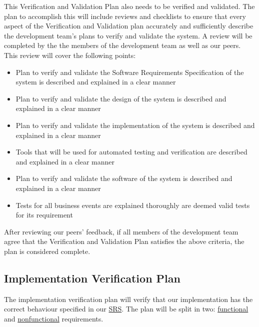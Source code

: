 \documentclass[12pt, titlepage]{article}
\begin{document}
This Verification and Validation Plan also needs to be verified and validated.
The plan to accomplish this will include reviews and checklists to ensure that
every aspect of the Verification and Validation plan accurately and sufficiently
describe the development team's plans to verify and validate the system. A
review will be completed by the the members of the development team as well as
our peers. This review will cover the following points:
\begin{itemize}
    \item Plan to verify and validate the Software Requirements Specification of
    the system is described and explained in a clear manner
    \item Plan to verify and validate the design of the system is described and
    explained in a clear manner
    \item Plan to verify and validate the implementation of the system is
    described and explained in a clear manner
    \item Tools that will be used for automated testing and verification are
    described and explained in a clear manner
    \item Plan to verify and validate the software of the system is described
    and explained in a clear manner
    \item Tests for all business events are explained thoroughly are deemed
    valid tests for its requirement
\end{itemize}

After reviewing our peers' feedback, if all members of the development team
agree that the Verification and Validation Plan satisfies the above criteria,
the plan is considered complete.

\subsection{Implementation Verification Plan}
\label{sec:implementation}


  
The implementation verification plan will verify that our implementation has the
correct behaviour specified in our
\href{https://github.com/parkd-app/park-d/blob/main/docs/SRS/SRS.pdf}{SRS}. The
plan will be split in two: \hyperref[sec:5.1]{functional} and
\hyperref[sec:5.2]{nonfunctional} requirements.
\end{document}
